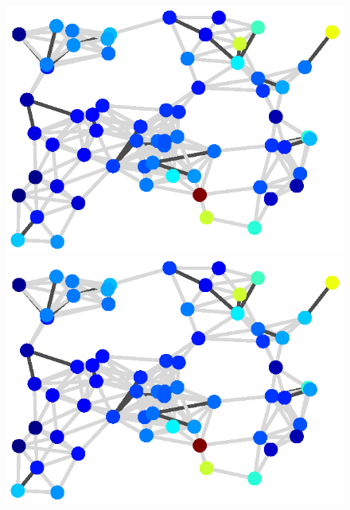 \newsavebox{\plotbox}
\newlength{\plottotalheight}
\setlength{\plottotalheight}{\dimexpr\ht\plotbox+\dp\plotbox\relax}
% 
\begin{figure}[t]
    \begin{center}
        \begin{minipage}{0.95\textwidth}
            \centering
            \begin{minipage}[t]{0.17\textwidth}
                \centering
                \includegraphics[width=\linewidth]{figures/true_and_observed/true_signal}
            \end{minipage}\hspace{0.3em}
            \begin{minipage}[t]{0.17\textwidth}
                \centering
                \includegraphics[width=\linewidth]{figures/restored/glr}

\end{minipage}
\end{minipage}
\end{center}
\end{figure}
